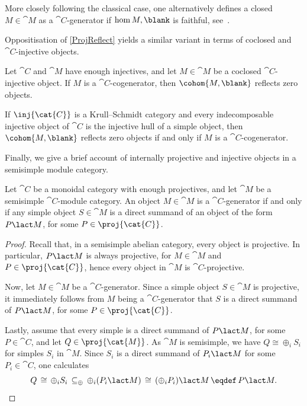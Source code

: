 More closely following the classical case,
one alternatively defines a closed \(M \in \cat{M}\) as a \(\cat{C}\)\hyp{}generator if \(\hom{M, \blank}\) is faithful,
see~\cite[Definition~2.21]{douglas19}.

Oppositisation of \cref{ProjReflect}
yields a similar variant in terms of coclosed and \(\cat{C}\)\hyp{}injective objects.

\begin{proposition}\label{InjReflect}
  Let \(\cat{C}\) and \(\cat{M}\) have enough injectives,
  and let \(M \in \cat{M}\) be a coclosed \(\cat{C}\)\hyp{}injective object.
  If \(M\) is a \(\cat{C}\)\hyp{}cogenerator, then \(\cohom{M, \blank}\) reflects zero objects.

  If \(\inj{\cat{C}}\) is a Krull--Schmidt category
  and every indecomposable injective object of \(\cat{C}\) is the injective hull of a simple object,
  then \(\cohom{M, \blank}\) reflects zero objects
  if and only if
  \(M\) is a \(\cat{C}\)\hyp{}cogenerator.
\end{proposition}

Finally, we give a brief account of internally projective and injective objects in a semisimple module category.

\begin{proposition}
  Let \(\cat{C}\) be a monoidal category with enough projectives, and let \(\cat{M}\) be a semisimple \(\cat{C}\)\hyp{}module category.%
  An object \(M \in \cat{M}\) is a \(\cat{C}\)\hyp{}generator if and only if any simple object \(S \in \cat{M}\) is a direct summand of an object of the form \(P \lact M\), for some \(P \in \proj{\cat{C}}\).
\end{proposition}
\begin{proof}
  Recall that, in a semisimple abelian category, every object is projective.
  In particular, \(P \lact M\) is always projective, for \(M \in \cat{M}\) and \(P \in \proj{\cat{C}}\),
  hence every object in \(\cat{M}\) is \(\cat{C}\)\hyp{}projective.

  Now, let \(M \in \cat{M}\) be a \(\cat{C}\)\hyp{}generator.
  Since a simple object \(S \in \cat{M}\) is projective,
  it immediately follows
  from \(M\) being a \(\cat{C}\)\hyp{}generator
  that \(S\) is a direct summand of \(P \lact M\), for some \(P \in \proj{\cat{C}}\).

  Lastly, assume that every simple is a direct summand of \(P \lact M\),
  for some \(P \in \cat{C}\),
  and let \(Q \in \proj{\cat{M}}\).
  As \(\cat{M}\) is semisimple, we have \(Q \cong \oplus_i S_i\) for simples \(S_i\) in \(\cat{M}\).
  Since \(S_i\) is a direct summand of \(P_i \lact M\) for some \(P_{i} \in \cat{C}\), one calculates
  \[
    Q \,\cong\, \oplus_i S_i \,\subseteq_{\oplus}\, \oplus_i (P_i \lact M) \,\cong\, (\oplus_i P_i) \lact M \,\eqdef\, P \lact M.\qedhere
  \]
\end{proof}

